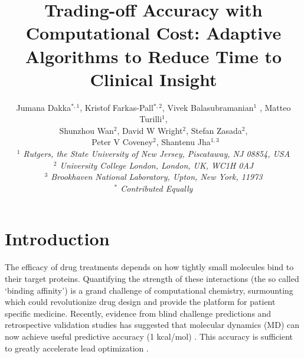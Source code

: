 \documentclass[conference]{IEEEtran}
\begin{document}


\title{Trading-off Accuracy with Computational Cost: Adaptive Algorithms to Reduce Time to Clinical Insight}




\author{Jumana Dakka$^{*,1}$, Kristof Farkas-Pall$^{*,2}$, Vivek Balasubramanian$^{1}$ , Matteo Turilli$^{1}$, \\
 Shunzhou Wan$^{2}$, David W Wright$^{2}$, Stefan Zasada$^{2}$, \\\
 Peter V Coveney$^{2}$, Shantenu Jha$^{1,3}$ \\

  \small{\emph{$^{1}$ Rutgers, the State University of New Jersey, Piscataway, NJ 08854, USA}}\\
   \small{\emph{$^{2}$ University College London, London, UK, WC1H 0AJ}}\\
   \small{\emph{$^{3}$ Brookhaven National Laboratory, Upton, New York, 11973}}\\
   \small{\emph{$^{*}$ Contributed Equally}}
}


\date{}
\maketitle

\begin{abstract}

\end{abstract}


\section{Introduction}\label{sec:intro}

The efficacy of drug treatments depends on how tightly small molecules bind to
their target proteins. Quantifying the strength of these interactions (the so
called ‘binding affinity’) is a grand challenge of computational chemistry,
surmounting which could revolutionize drug design and provide the platform for
patient specific medicine. Recently, evidence from blind challenge predictions
and retrospective validation studies has suggested that molecular dynamics
(MD) can now achieve useful predictive accuracy (1 kcal/mol) \cite{shirts-
mobley-chodera:2007:annu-rep-comput-chem:prime-time, abel:jacs:2015:fep-plus}.
This accuracy is sufficient to greatly accelerate lead optimization 
\cite{shirts-mobley-brown:2009:sbdd}.
\end{document}
